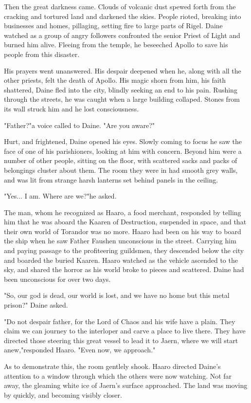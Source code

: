 Then the great darkness came. Clouds of volcanic dust spewed forth from the cracking and tortured land and darkened the skies. People rioted, breaking into businesses and homes, pillaging, setting fire to large parts of Rigel. Daine watched as a group of angry followers confronted the senior Priest of Light and burned him alive. Fleeing from the temple, he beseeched Apollo to save his people from this disaster.

His prayers went unanswered. His despair deepened when he, along with all the other priests, felt the death of
Apollo. His magic shorn from him, his faith shattered, Daine fled into the city, blindly seeking an end to his pain. Rushing through the streets, he was caught when a large building collaped. Stones from its wall struck him and he lost consciousness.

"Father?"a voice called to Daine. "Are you aware?"

Hurt, and frightened, Daine opened his eyes. Slowly coming to focus he saw the face of one of his parishioners, looking at him with concern. Beyond him were a number of other people, sitting on the floor, with scattered sacks and packs of belongings cluster about them. The room they were in had smooth grey walls, and was lit from strange harsh lanterns set behind panels in the ceiling.

"Yes... I am. Where are we?"he asked.

The man, whom he recognized as Haaro, a food merchant, responded by telling him that he was aboard the Kaaren of Destruction, suspended in space, and that their own world of Torandor was no more. Haaro had been on his way to board the ship when he saw Father Faushen unconscious in the street.  Carrying him and paying passage to the profiteering guildsmen, they descended below the city and boarded the buried Kaaren. Haaro watched as the vehicle ascended to the sky, and shared the horror as his world broke to pieces and scattered. Daine had been unconscious for over two days.

"So, our god is dead, our world is lost, and we have no home but this metal prison?" Daine asked.

"Do not despair father, for the Lord of Chaos and his wife have a plain. They claim we can journey to the interloper and carve a place to live there. They have directed those steering this great vessel to lead it to Jaern, where we will start anew,"responded Haaro. "Even now, we approach."

As to demonstrate this, the room gentlely shook. Haaro directed Daine's attention to a window through which the others were now watching. Not far away, the gleaming white ice of Jaern's surface approached. The land was moving by quickly, and becoming visibly closer.

